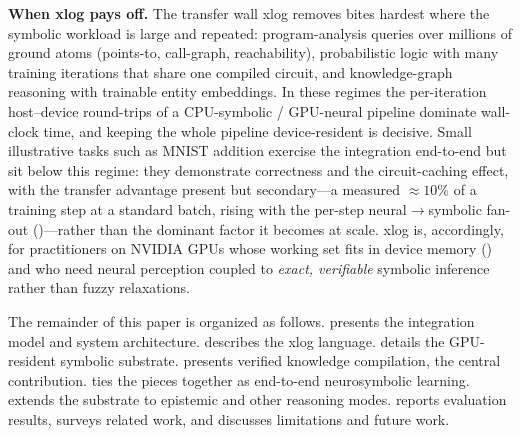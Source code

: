 \textbf{When xlog pays off.} The transfer wall xlog removes bites hardest where the symbolic workload is large and repeated: program-analysis queries over millions of ground atoms (points-to, call-graph, reachability), probabilistic logic with many training iterations that share one compiled circuit, and knowledge-graph reasoning with trainable entity embeddings. In these regimes the per-iteration host--device round-trips of a CPU-symbolic / GPU-neural pipeline dominate wall-clock time, and keeping the whole pipeline device-resident is decisive. Small illustrative tasks such as MNIST addition exercise the integration end-to-end but sit below this regime: they demonstrate correctness and the circuit-caching effect, with the transfer advantage present but secondary---a measured ${\approx}10\%$ of a training step at a standard batch, rising with the per-step neural$\to$symbolic fan-out ()---rather than the dominant factor it becomes at scale. xlog is, accordingly, for practitioners on NVIDIA GPUs whose working set fits in device memory () and who need neural perception coupled to \emph{exact, verifiable} symbolic inference rather than fuzzy relaxations.

The remainder of this paper is organized as follows.  presents the integration model and system architecture.  describes the xlog language.  details the GPU-resident symbolic substrate.  presents verified knowledge compilation, the central contribution.  ties the pieces together as end-to-end neurosymbolic learning.  extends the substrate to epistemic and other reasoning modes.  reports evaluation results,  surveys related work, and  discusses limitations and future work.
